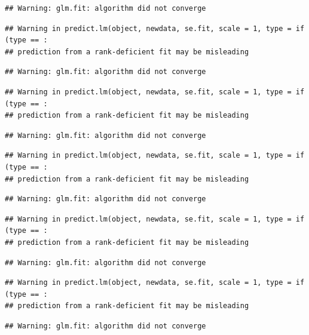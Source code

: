 \documentclass[
]{article}
\begin{document}
\begin{verbatim}
## Warning: glm.fit: algorithm did not converge
\end{verbatim}

\begin{verbatim}
## Warning in predict.lm(object, newdata, se.fit, scale = 1, type = if (type == :
## prediction from a rank-deficient fit may be misleading
\end{verbatim}

\begin{verbatim}
## Warning: glm.fit: algorithm did not converge
\end{verbatim}

\begin{verbatim}
## Warning in predict.lm(object, newdata, se.fit, scale = 1, type = if (type == :
## prediction from a rank-deficient fit may be misleading
\end{verbatim}

\begin{verbatim}
## Warning: glm.fit: algorithm did not converge
\end{verbatim}

\begin{verbatim}
## Warning in predict.lm(object, newdata, se.fit, scale = 1, type = if (type == :
## prediction from a rank-deficient fit may be misleading
\end{verbatim}

\begin{verbatim}
## Warning: glm.fit: algorithm did not converge
\end{verbatim}

\begin{verbatim}
## Warning in predict.lm(object, newdata, se.fit, scale = 1, type = if (type == :
## prediction from a rank-deficient fit may be misleading
\end{verbatim}

\begin{verbatim}
## Warning: glm.fit: algorithm did not converge
\end{verbatim}

\begin{verbatim}
## Warning in predict.lm(object, newdata, se.fit, scale = 1, type = if (type == :
## prediction from a rank-deficient fit may be misleading
\end{verbatim}

\begin{verbatim}
## Warning: glm.fit: algorithm did not converge
\end{verbatim}
\end{document}
